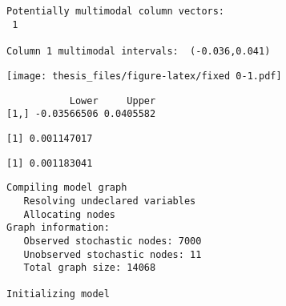 \documentclass[12pt,twoside]{dukestatscithesis}
\theoremstyle{definition}
\theoremstyle{definition}
\theoremstyle{definition}
\theoremstyle{remark}
\begin{document}
\begin{verbatim}


Potentially multimodal column vectors:
 1 

Column 1 multimodal intervals:  (-0.036,0.041) 
\end{verbatim}
\texttt{[image: thesis\_files/figure-latex/fixed 0-1.pdf]}
\begin{verbatim}
           Lower     Upper
[1,] -0.03566506 0.0405582
\end{verbatim}
\begin{Shaded}
\begin{Highlighting}[]
\OperatorTok{$}\OperatorTok{$}\OperatorTok{$}
\end{Highlighting}
\end{Shaded}
\begin{verbatim}
[1] 0.001147017
\end{verbatim}
\begin{Shaded}
\begin{Highlighting}[]
\OperatorTok{$}\OperatorTok{$}\OperatorTok{$}
\end{Highlighting}
\end{Shaded}
\begin{verbatim}
[1] 0.001183041
\end{verbatim}
\begin{Shaded}
\begin{Highlighting}[]
\StringTok{ }\NormalTok{(}
                    \NormalTok{, }\NormalTok{(}\NormalTok{, }\NormalTok{, }\NormalTok{,}\NormalTok{),}
\end{Highlighting}
\end{Shaded}
\begin{verbatim}
Compiling model graph
   Resolving undeclared variables
   Allocating nodes
Graph information:
   Observed stochastic nodes: 7000
   Unobserved stochastic nodes: 11
   Total graph size: 14068

Initializing model
\end{verbatim}
\end{document}
